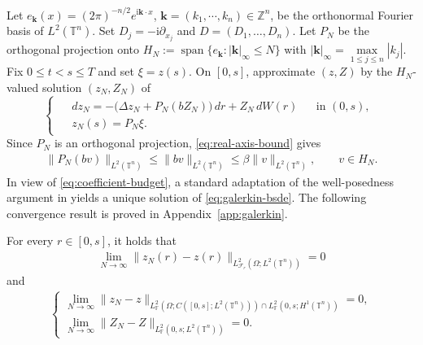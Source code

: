 \documentclass[print,wide]{draft}
\begin{document}
Let $e_{\mathbf k}(x)=(2\pi)^{-n/2}e^{\mathrm{i}{\mathbf k}\cdot x}$, $\mathbf k=(k_1,\cdots,k_n)\in\mathbb Z^n$,
be the orthonormal Fourier basis of $L^2(\mathbb{T}^n)$.  Set
$D_j=-\mathrm{i}\partial_{x_j}$ and
$D=(D_1,\ldots,D_n)$. 
Let $P_N$ be the orthogonal projection onto
$H_N:=\operatorname{span}\{e_{\mathbf k}:|\mathbf k|_\infty\leq N\}$ with $|\mathbf k|_\infty = \max\limits_{1\leq j\leq n}|k_j|$.
Fix $0\leq t<s\leq T$ and set $\xi=z(s)$.
On $[0,s]$, approximate $(z,Z)$ by the $H_N$-valued solution $(z_N,Z_N)$ of
\begin{equation}\label{eq:galerkin-bsde}
\begin{cases}
\begin{aligned}
&d z_N
=-\bigl(\Delta z_N+P_N(bZ_N)\bigr)\,dr
+Z_N\,dW(r)
&&\text{in }(0,s),\\
&z_N(s)=P_N\xi.
\end{aligned}
\end{cases}
\end{equation}
Since $P_N$ is an orthogonal projection, \eqref{eq:real-axis-bound} gives
\begin{align*}
\|P_N(bv)\|_{L^2(\mathbb{T}^n)}
\leq\|bv\|_{L^2(\mathbb{T}^n)}
\leq\beta\|v\|_{L^2(\mathbb{T}^n)},\qquad v\in H_N.
\end{align*}
In view of \eqref{eq:coefficient-budget}, a standard adaptation of the
well-posedness argument in \cite[Section~4.4]{Lue2021a} yields a unique
solution of \eqref{eq:galerkin-bsde}.  The following convergence result
is proved in Appendix~\ref{app:galerkin}.

\begin{lemma}\label{lem:galerkin-identification}
For every $r\in[0,s]$, it holds that
%
\begin{align}\label{eq:galerkin-strong-time}
\lim_{N\to\infty}\|z_N(r)- z(r)\|_{L^2_{\mathcal{F}_r}(\Omega;L^2(\mathbb{T}^n))}
=0 
\end{align}
%
and
\begin{align}\label{eq:galerkin-strong-time-1}
\begin{cases}
\displaystyle\lim_{N\to\infty}\|z_N- z\|_{L^2_{\mathbb F}(\Omega;C([0,s];L^2(\mathbb{T}^n)))
\cap L^2_{\mathbb F}(0,s;H^1(\mathbb{T}^n))}=0,\\[2pt]
\displaystyle\lim_{N\to\infty}\|Z_N- Z\|_{L^2_{\mathbb F}(0,s;L^2(\mathbb{T}^n))}=0.
\end{cases}
\end{align}
\end{lemma}
\end{document}
